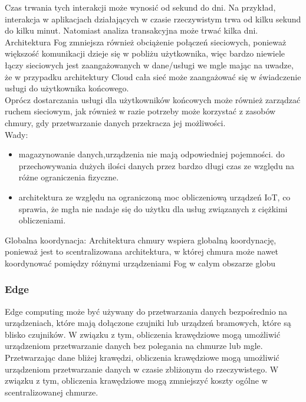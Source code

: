 Czas trwania tych interakcji może wynosić od sekund do dni. Na przykład, interakcja w aplikacjach działających w czasie rzeczywistym trwa od kilku sekund do kilku minut. Natomiast analiza transakcyjna może trwać kilka dni. \\

Architektura Fog zmniejsza również obciążenie połączeń sieciowych, ponieważ większość komunikacji dzieje się w pobliżu użytkownika, więc bardzo niewiele łączy sieciowych jest zaangażowanych w dane/usługi we mgle mając na uwadze, że w przypadku architektury Cloud cała sieć może zaangażować się w świadczenie usługi do użytkownika końcowego. \\

Oprócz dostarczania usługi dla użytkowników końcowych może również zarządzać ruchem sieciowym, jak również w razie potrzeby może korzystać z zasobów chmury, gdy przetwarzanie danych przekracza jej możliwości. \\

Wady:

\begin{itemize}
	\item magazynowanie danych,urządzenia nie mają odpowiedniej pojemności. do przechowywania dużych ilości danych przez bardzo długi czas ze względu na różne ograniczenia fizyczne.
	\item architektura ze względu na ograniczoną moc obliczeniową urządzeń IoT, co sprawia, że mgła nie nadaje się do użytku dla usług związanych z ciężkimi obliczeniami. \\
\end{itemize}

Globalna koordynacja: Architektura chmury wspiera globalną koordynację, ponieważ jest to scentralizowana architektura, w której chmura może nawet koordynować pomiędzy różnymi urządzeniami Fog w całym obszarze globu

\subsubsection{Edge}

Edge computing może być używany do przetwarzania danych bezpośrednio na urządzeniach, które mają dołączone czujniki lub urządzeń bramowych, które są blisko czujników. W związku z tym, obliczenia krawędziowe mogą umożliwić urządzeniom przetwarzanie danych bez polegania na chmurze lub mgle. Przetwarzając dane bliżej krawędzi, obliczenia krawędziowe mogą umożliwić urządzeniom przetwarzanie danych w czasie zbliżonym do rzeczywistego. W związku z tym, obliczenia krawędziowe mogą zmniejszyć koszty ogólne w scentralizowanej chmurze. \\

